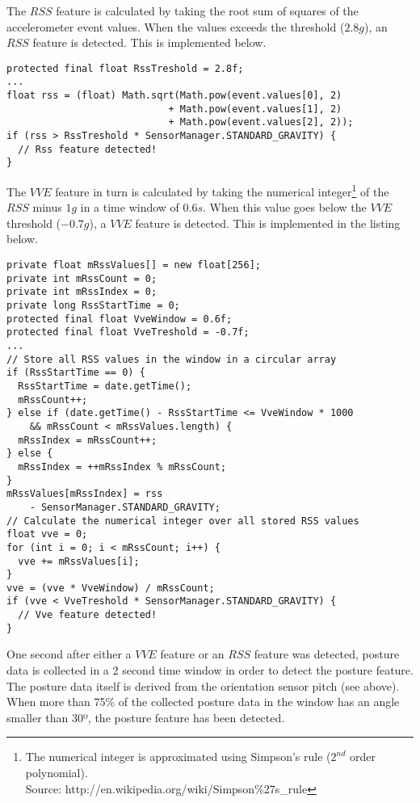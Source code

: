 \documentclass[a4paper, 10pt]{article}
\begin{document}
The $RSS$ feature is calculated by taking the root sum of squares of the accelerometer event values. When the values exceeds the threshold ($2.8g$), an $RSS$ feature is detected. This is implemented below.
\begin{lstlisting}
protected final float RssTreshold = 2.8f;
...
float rss = (float) Math.sqrt(Math.pow(event.values[0], 2)
                            + Math.pow(event.values[1], 2)
                            + Math.pow(event.values[2], 2));
if (rss > RssTreshold * SensorManager.STANDARD_GRAVITY) {  
  // Rss feature detected!
}
\end{lstlisting}
The $VVE$ feature in turn is calculated by taking the numerical integer\footnote{The numerical integer is approximated using Simpson's rule ($2^{nd}$ order polynomial).\\Source: http://en.wikipedia.org/wiki/Simpson\%27s\_rule} of the $RSS$ minus $1g$ in a time window of $0.6s$. When this value goes below the $VVE$ threshold ($-0.7g$), a $VVE$ feature is detected. This is implemented in the listing below.
\begin{lstlisting}
private float mRssValues[] = new float[256];
private int mRssCount = 0;
private int mRssIndex = 0;
private long RssStartTime = 0;
protected final float VveWindow = 0.6f;
protected final float VveTreshold = -0.7f;
...
// Store all RSS values in the window in a circular array
if (RssStartTime == 0) {
  RssStartTime = date.getTime();
  mRssCount++;
} else if (date.getTime() - RssStartTime <= VveWindow * 1000
    && mRssCount < mRssValues.length) {
  mRssIndex = mRssCount++;
} else {
  mRssIndex = ++mRssIndex % mRssCount;
}
mRssValues[mRssIndex] = rss
    - SensorManager.STANDARD_GRAVITY;
// Calculate the numerical integer over all stored RSS values
float vve = 0;
for (int i = 0; i < mRssCount; i++) {
  vve += mRssValues[i];
}
vve = (vve * VveWindow) / mRssCount;
if (vve < VveTreshold * SensorManager.STANDARD_GRAVITY) {
  // Vve feature detected!
}
\end{lstlisting}
One second after either a $VVE$ feature or an $RSS$ feature was detected, posture data is collected in a 2 second time window in order to detect the posture feature. The posture data itself is derived from the orientation sensor pitch (see above). When more than 75\% of the collected posture data in the window has an angle smaller than 30º, the posture feature has been detected.
\end{document}
